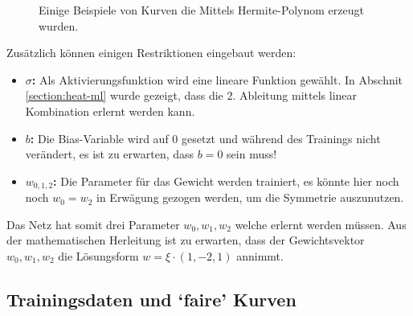\begin{figure}
	\centering
	
	\label{fig:mst_neuronalnetworkdemo}
	\caption{Einige Beispiele von Kurven die Mittels Hermite-Polynom erzeugt wurden.}
\end{figure}

Zusätzlich können einigen Restriktionen eingebaut werden:
\begin{itemize}
	\item {\textbf{$\sigma$:} Als Aktivierungsfunktion wird eine lineare Funktion gewählt. In Abschnit \ref{section:heat-ml} wurde gezeigt, dass die 2. Ableitung mittels linear Kombination erlernt werden kann.}
	\item {\textbf{$b$:} Die Bias-Variable wird auf 0 gesetzt und während des Trainings nicht verändert, es ist zu erwarten, dass $b=0$ sein muss!}
	\item {\textbf{$w_{0,1,2}$:} Die Parameter für das Gewicht werden trainiert, es könnte hier noch noch $w_0 = w_2$ in Erwägung gezogen werden, um die Symmetrie auszunutzen.}
\end{itemize}
Das Netz hat somit drei Parameter $w_0, w_1, w_2$ welche erlernt werden müssen. Aus der mathematischen Herleitung ist zu erwarten, dass der Gewichtsvektor  $w_0, w_1, w_2$ die Lösungsform $w = \xi \cdot (1, -2, 1)$ annimmt.

\subsection{Trainingsdaten und `faire' Kurven}
